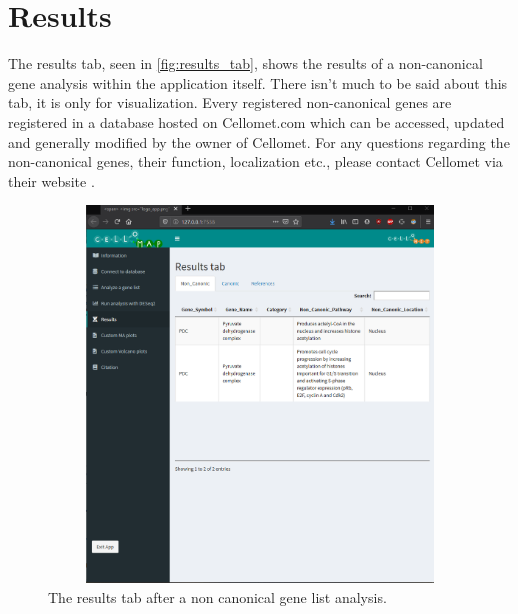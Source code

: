 \documentclass[11pt]{article}
\begin{document}
\section{Results \label{res}}
The results tab, seen in \autoref{fig:results_tab}, shows the results of a non-canonical gene analysis within the application itself. There isn't much to be said about this tab, it is only for visualization.
Every registered non-canonical genes are registered in a database hosted on Cellomet.com which can be accessed, updated and generally modified by the owner of Cellomet. For any questions regarding the non-canonical genes, their function, localization etc., please contact Cellomet via their website \cite{Cellomet}.

\begin{figure}[h!]
\centering
\includegraphics[width=15cm,height=10cm,keepaspectratio]{results_tab.png}
\caption{The results tab after a non canonical gene list analysis.}
\label{fig:results_tab}
\end{figure}
\end{document}
